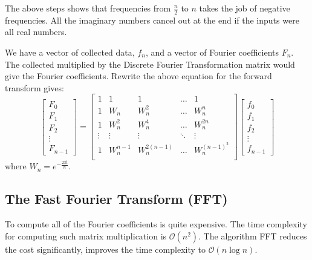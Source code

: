 The above steps shows that frequencies from $\frac{n}{2}$ to $n$ takes the job of negative frequencies. 
All the imaginary numbers cancel out at the end if the inputs were all real numbers. 

We have a vector of collected data, $f_n$, and a vector of Fourier coefficients $F_n$. 
The collected multiplied by the Discrete Fourier Transformation matrix would give the Fourier coefficients. 
Rewrite the above equation for the forward transform gives:
\begin{equation}
    \begin{bmatrix}
        F_0 \\  F_1 \\ F_2  \\  \vdots \\   F_{n-1}
    \end{bmatrix}
    =
    \begin{bmatrix}
        1   &   1           &   1               &   \dots   &   1               \\
        1   &   W_n         &   W_n^2           &   \dots   &   W_n^n           \\
        1   &   W_n^2       &   W_n^4           &   \dots   &   W_n^{2n}        \\
        \vdots & \vdots     &   \vdots          &   \ddots  &   \vdots          \\
        1   &   W_n^{n-1}   &   W_n^{2(n-1)}    &   \dots   &   W_n^{(n-1)^2}   \\
    \end{bmatrix}
    \begin{bmatrix}
        f_0 \\  f_1 \\ f_2  \\  \vdots \\   f_{n-1}
    \end{bmatrix}
    \label{equ:DFT_matrix}
\end{equation}
where $W_n = e^{-\frac{2\pi\mathrm{i}}{n}}$.


\subsection{The Fast Fourier Transform (FFT)}
To compute all of the Fourier coefficients is quite expensive. 
The time complexity for computing such matrix multiplication is $\mathcal{O}(n^2)$. 
The algorithm FFT reduces the cost significantly, improves the time complexity to $\mathcal{O}(n\log n)$. 

